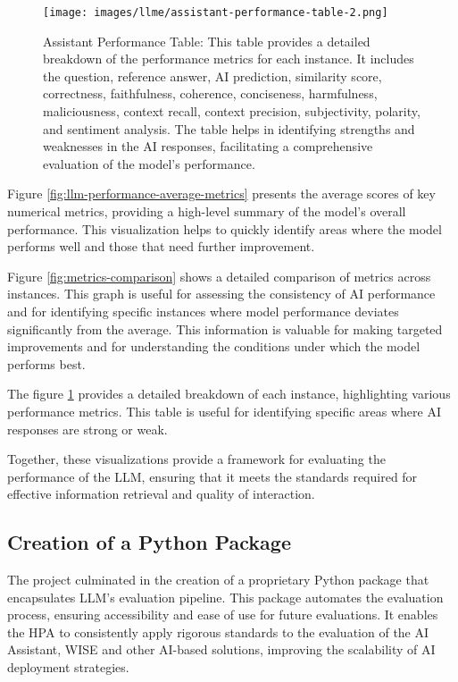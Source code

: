 \begin{figure}[h!]
    \centering
    \texttt{[image: images/llme/assistant-performance-table-2.png]}
    \caption{Assistant Performance Table: This table provides a detailed breakdown of the performance metrics for each instance. It includes the question, reference answer, AI prediction, similarity score, correctness, faithfulness, coherence, conciseness, harmfulness, maliciousness, context recall, context precision, subjectivity, polarity, and sentiment analysis. The table helps in identifying strengths and weaknesses in the AI responses, facilitating a comprehensive evaluation of the model's performance.}
    \label{fig:assistant-performance-table}
\end{figure}

Figure \ref{fig:llm-performance-average-metrics} presents the average scores of key numerical metrics, providing a high-level summary of the model's overall performance. This visualization helps to quickly identify areas where the model performs well and those that need further improvement.

Figure \ref{fig:metrics-comparison} shows a detailed comparison of metrics across instances. This graph is useful for assessing the consistency of AI performance and for identifying specific instances where model performance deviates significantly from the average. This information is valuable for making targeted improvements and for understanding the conditions under which the model performs best.

The figure \ref{fig:assistant-performance-table} provides a detailed breakdown of each instance, highlighting various performance metrics. This table is useful for identifying specific areas where AI responses are strong or weak.

Together, these visualizations provide a framework for evaluating the performance of the LLM, ensuring that it meets the standards required for effective information retrieval and quality of interaction.

\subsection{Creation of a Python Package}

The project culminated in the creation of a proprietary Python package that encapsulates LLM's evaluation pipeline. This package automates the evaluation process, ensuring accessibility and ease of use for future evaluations. It enables the HPA to consistently apply rigorous standards to the evaluation of the AI Assistant, WISE and other AI-based solutions, improving the scalability of AI deployment strategies.

